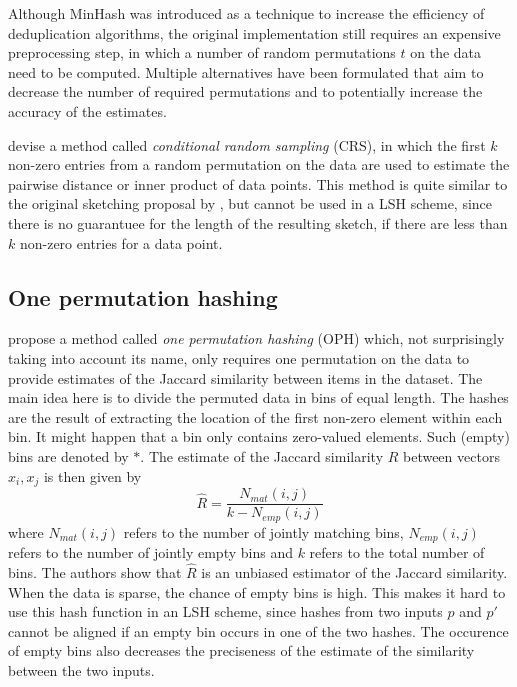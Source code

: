 Although MinHash was introduced as a technique to increase the efficiency of deduplication algorithms, the original implementation still requires an expensive preprocessing step, in which a number of random permutations $t$ on the data need to be computed. Multiple alternatives have been formulated that aim to decrease the number of required permutations and to potentially increase the accuracy of the estimates.

\cite{LiCH06} devise a method called \textit{conditional random sampling} (CRS), in which the first $k$ non-zero entries from a random permutation on the data are used to estimate the pairwise distance or inner product of data points. This method is quite similar to the original sketching proposal by \cite{Broder97}, but cannot be used in a LSH scheme, since there is no guarantuee for the length of the resulting sketch, if there are less than $k$ non-zero entries for a data point.

\subsection{One permutation hashing}

\cite{Ping2012} propose a method called \textit{one permutation hashing} (OPH) which, not surprisingly taking into account its name, only requires one permutation on the data to provide estimates of the Jaccard similarity between items in the dataset. The main idea here is to divide the permuted data in bins of equal length. The hashes are the result of extracting the location of the first non-zero element within each bin. It might happen that a bin only contains zero-valued elements. Such (empty) bins are denoted by $*$. The estimate of the Jaccard similarity $\hat{R}$ between vectors $x_i, x_j$ is then given by 
\begin{equation}
    \hat{R} = \frac{N_{mat}(i,j)}{k-N_{emp}(i,j)}
\end{equation}
where $N_{mat}(i,j)$ refers to the number of jointly matching bins, $N_{emp}(i,j)$ refers to the number of jointly empty bins and $k$ refers to the total number of bins. The authors show that $\hat{R}$ is an unbiased estimator of the Jaccard similarity. When the data is  sparse, the chance of empty bins is high. This makes it hard to use this hash function in an LSH scheme, since hashes from two inputs $p$ and $p'$ cannot be aligned if an empty bin occurs in one of the two hashes. The occurence of empty bins also decreases the preciseness of the estimate of the similarity between the two inputs.

